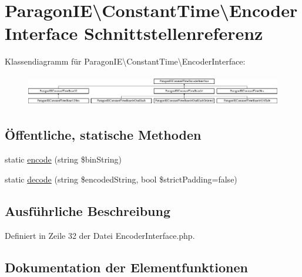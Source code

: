 \hypertarget{interface_paragon_i_e_1_1_constant_time_1_1_encoder_interface}{}\section{Paragon\+IE\textbackslash{}Constant\+Time\textbackslash{}Encoder\+Interface Schnittstellenreferenz}
\label{interface_paragon_i_e_1_1_constant_time_1_1_encoder_interface}
Klassendiagramm für Paragon\+IE\textbackslash{}Constant\+Time\textbackslash{}Encoder\+Interface\+:\begin{figure}[H]
\begin{center}
\leavevmode
\includegraphics[height=1.390728cm]{interface_paragon_i_e_1_1_constant_time_1_1_encoder_interface}
\end{center}
\end{figure}
\subsection*{Öffentliche, statische Methoden}
\begin{DoxyCompactItemize}
\item 
static \mbox{\hyperlink{interface_paragon_i_e_1_1_constant_time_1_1_encoder_interface_a6b9b7e0f5446b6b08b074a9fc7ae3c61}{encode}} (string \$bin\+String)
\item 
static \mbox{\hyperlink{interface_paragon_i_e_1_1_constant_time_1_1_encoder_interface_a614b43269cc9bc0291bd79e79ccfc278}{decode}} (string \$encoded\+String, bool \$strict\+Padding=false)
\end{DoxyCompactItemize}


\subsection{Ausführliche Beschreibung}


Definiert in Zeile 32 der Datei Encoder\+Interface.\+php.



\subsection{Dokumentation der Elementfunktionen}
\mbox{\label{interface_paragon_i_e_1_1_constant_time_1_1_encoder_interface_a614b43269cc9bc0291bd79e79ccfc278}} 
